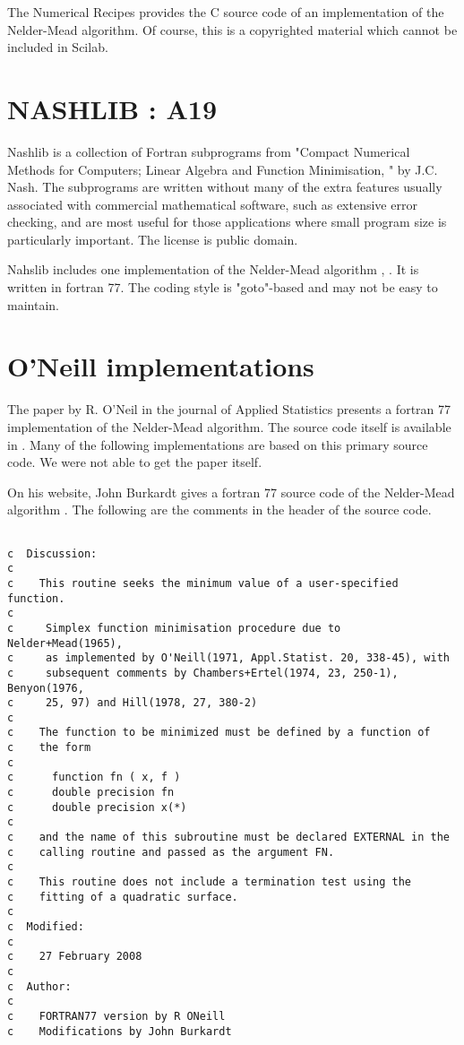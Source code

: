 The Numerical Recipes \cite{NumericalRecipes} provides the C source code of an 
implementation of the Nelder-Mead algorithm. Of course, this is a 
copyrighted material which cannot be included in Scilab.

\section{NASHLIB : A19}

Nashlib is a collection of Fortran subprograms from "Compact Numerical 
Methods for Computers; Linear Algebra and Function Minimisation, " by 
J.C. Nash. The subprograms are written without many of the extra 
features usually associated with commercial mathematical software, such 
as extensive error checking, and are most useful for those applications 
where small program size is particularly important. The license is 
public domain.

Nahslib includes one implementation of the Nelder-Mead algorithm \cite{GAMS-A19A20-Desc}, 
\cite{GAMS-A19A20-Source}. It is written in fortran 77. The coding style is "goto"-based and 
may not be easy to maintain.

\section{O'Neill implementations}

The paper \cite{O'Neill1971AAF} by R. O'Neil in the journal of Applied Statistics 
presents a fortran 77 implementation of the Nelder-Mead algorithm. The 
source code itself is available in \cite{O'NeillAS47}. Many of the following 
implementations are based on this primary source code. We were not able 
to get the paper \cite{O'Neill1971AAF} itself.

On his website, John Burkardt gives a fortran 77 source code of the 
Nelder-Mead algorithm \cite{Burkardtasa047}. The following are the comments in the header 
of the source code.

\begin{verbatim}

c  Discussion:
c
c    This routine seeks the minimum value of a user-specified function.
c
c     Simplex function minimisation procedure due to Nelder+Mead(1965),
c     as implemented by O'Neill(1971, Appl.Statist. 20, 338-45), with
c     subsequent comments by Chambers+Ertel(1974, 23, 250-1), Benyon(1976,
c     25, 97) and Hill(1978, 27, 380-2)
c
c    The function to be minimized must be defined by a function of
c    the form
c
c      function fn ( x, f )
c      double precision fn
c      double precision x(*)
c
c    and the name of this subroutine must be declared EXTERNAL in the
c    calling routine and passed as the argument FN.
c
c    This routine does not include a termination test using the
c    fitting of a quadratic surface.
c
c  Modified:
c
c    27 February 2008
c
c  Author:
c
c    FORTRAN77 version by R ONeill
c    Modifications by John Burkardt

\end{verbatim}

